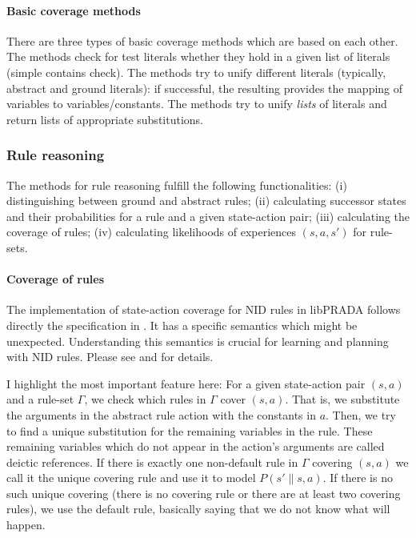 \documentclass[10pt,twoside,twocolumn,fleqn]{article}
\begin{document}
\paragraph{Basic coverage methods}

There are three types of basic coverage methods which are based on each
other. The  methods check for test literals whether they hold
in a given list of literals (simple contains check). The 
methods try to unify different literals (typically, abstract and ground
literals): if successful, the resulting  provides the
mapping of variables to variables/constants. The  methods try
to unify \emph{lists} of literals and return lists of appropriate
substitutions.



\subsubsection{Rule reasoning}

The methods for rule reasoning fulfill the following functionalities: (i)
distinguishing between ground and abstract rules; (ii) calculating
successor states and their probabilities for a rule and a given
state-action pair; (iii) calculating the coverage of rules; (iv)
calculating likelihoods of experiences $(s,a,s')$ for rule-sets.

\paragraph{Coverage of rules}

The implementation of state-action coverage for NID rules in libPRADA
follows directly the specification in \citet{pasula07ai}. It has a specific
semantics which might be unexpected. Understanding this semantics is
crucial for learning and planning with NID rules. Please see
\citet{pasula07ai} and \citet{lang-toussaint-10jair} for details.

I highlight the most important feature here: For a given state-action pair
$(s,a)$ and a rule-set $\Gamma$, we check which rules in $\Gamma$ cover
$(s,a)$. That is, we substitute the arguments in the abstract rule action
with the constants in $a$. Then, we try to find a unique substitution for
the remaining variables in the rule. These remaining variables which do not
appear in the action's arguments are called deictic references. If there is
exactly one non-default rule in $\Gamma$ covering $(s,a)$ we call it the
unique covering rule and use it to model $P(s'\|s,a)$. If there is no such
unique covering (there is no covering rule or there are at least two
covering rules), we use the default rule, basically saying that we do not
know what will happen.
\end{document}
